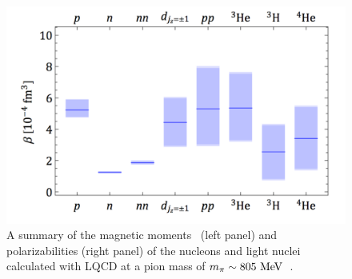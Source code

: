 %
\begin{figure}[!t]
	\centering
	\includegraphics[width=0.95\columnwidth]{figures/PhysPols.pdf}
	\caption{ 
		A summary of the magnetic moments~\protect\cite{Beane:2014ora} (left panel) and polarizabilities (right panel) of the nucleons and
		light nuclei calculated with LQCD at a pion mass of
		$m_\pi\sim 805~{\rm MeV}$~\protect\cite{Chang:2015qxa}.    }
	\label{fig:summaryBETA}
\end{figure}


